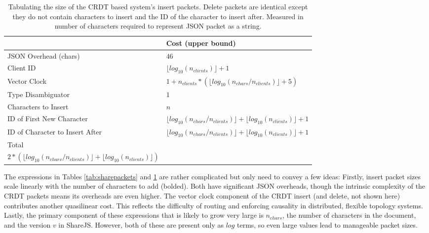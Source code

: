 \documentclass[12pt,a4paper,twoside,openright]{report}
\begin{document}
			\begin{table}[htb]
			\centering
			\caption[CRDT System Insert Packet Size]{Tabulating the size of the CRDT based system's insert packets. Delete packets are identical except they do not contain characters to insert and the ID of the character to insert after. Measured in number of characters required to represent JSON packet as a string.}
			\label{tab:crdtinsertpacket}
			\setlength{\tabcolsep}{12pt}
			\begin{tabular}{@{}ll@{}}
			
                             & Cost (upper bound)\\ \toprule                                                                                                                                                       
			JSON Overhead (chars)      & $46$ \\ \midrule
			Client ID                       & $\lfloor log_{10}(n_{clients}) \rfloor+1$  \\ \midrule
			Vector Clock                    & $1 + n_{clients} * (\lfloor log_{10}(n_{chars}/n_{clients})\rfloor + 5)$ \\ \midrule
			Type Disambiguator              & $1$ \\ \midrule
			Characters to Insert            & $n$ \\ \midrule
			ID of First New Character       & $\lfloor log_{10}(n_{chars}/n_{clients}) \rfloor + \lfloor log_{10}(n_{clients}) \rfloor  +1$  \\ \midrule
			ID of Character to Insert After & $\lfloor log_{10}(n_{chars}/n_{clients}) \rfloor + \lfloor log_{10}(n_{clients}) \rfloor +1$  \\ \bottomrule
			Total                           & \makecell{$51 + \boldsymbol{n} + \boldsymbol{5n_{clients}} + \boldsymbol{n_{clients} *(\lfloor log_{10}(n_{chars}/n_{clients}\rfloor)} +$ \\ $2*(\lfloor log_{10}(n_{chars}/n_{clients}) \rfloor + \lfloor log_{10}(n_{clients}) \rfloor)$}
			\end{tabular}
			\end{table}
			
			The expressions in Tables \ref{tab:sharepackets} and \ref{tab:crdtinsertpacket} are rather complicated but only need to convey a few ideas: Firstly, insert packet sizes scale linearly with the number of characters to add (bolded). Both have significant JSON overheads, though the intrinsic complexity of the CRDT packets means its overheads are even higher. The vector clock component of the CRDT insert (and delete, not shown here) contributes another quasilinear cost. This reflects the difficulty of routing and enforcing causality in distributed, flexible topology systems. Lastly, the primary component of these expressions that is likely to grow very large is $n_{chars}$, the number of characters in the document, and the version $v$ in ShareJS. However, both of these are present only as $log$ terms, so even large values lead to manageable packet sizes.
			
\end{document}
